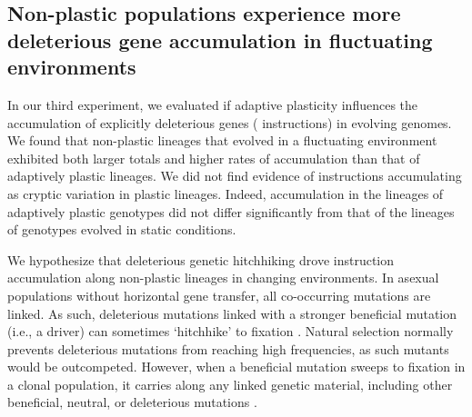 \vspace{0.25cm}
\subsection{Non-plastic populations experience more deleterious gene accumulation in fluctuating environments}

In our third experiment, we evaluated if adaptive plasticity influences the accumulation of explicitly deleterious genes ( instructions) in evolving genomes.
We found that non-plastic lineages that evolved in a fluctuating environment exhibited both larger totals and higher rates of  accumulation than that of adaptively plastic lineages.
We did not find evidence of  instructions accumulating as cryptic variation in plastic lineages.
Indeed,  accumulation in the lineages of adaptively plastic genotypes did not differ significantly from that of the lineages of genotypes evolved in static conditions.

We hypothesize that deleterious genetic hitchhiking drove  instruction accumulation along non-plastic lineages in changing environments.
In asexual populations without horizontal gene transfer, all co-occurring mutations are linked.
As such, deleterious mutations linked with a stronger beneficial mutation (i.e., a driver) can sometimes `hitchhike' to fixation \citep{smith_hitch-hiking_1974,van_den_bergh_experimental_2018,buskirk_hitchhiking_2017}.
Natural selection normally prevents deleterious mutations from reaching high frequencies, as such mutants would be outcompeted.
However, when a beneficial mutation sweeps to fixation in a clonal population, it carries along any linked genetic material, including other beneficial, neutral, or deleterious mutations  \cite{barton_genetic_2000, smith_hitch-hiking_1974}.

